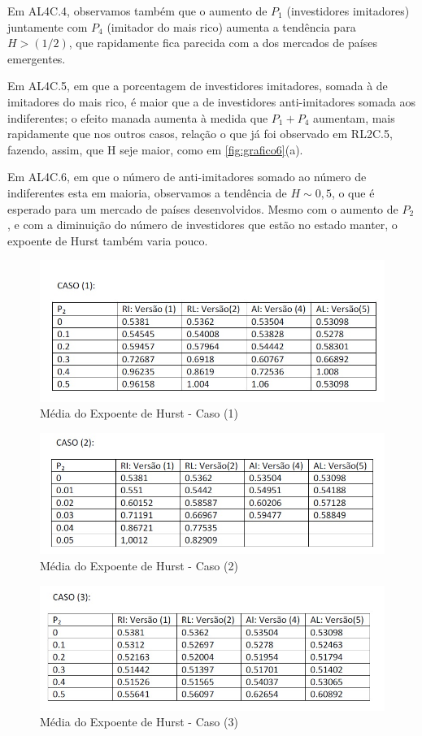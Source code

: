 \documentclass[brazil,ruledheader]{abnt}
\begin{document}
Em AL4C.4, observamos também que o aumento de $P_1$ (investidores imitadores)
juntamente com $P_4$ (imitador do mais rico) aumenta a tendência para $H>(1/2)$,
que rapidamente fica parecida com a dos mercados de países emergentes. 

Em AL4C.5, em que a porcentagem de investidores imitadores, somada à de 
imitadores do mais rico, é maior que a de investidores anti-imitadores somada
aos indiferentes; o efeito manada aumenta à medida que $P_1+P_4$ aumentam, mais
rapidamente que nos outros casos, relação o que já foi observado em RL2C.5,
fazendo, assim, que H seje maior, como em \ref{fig:grafico6}(a).   

Em AL4C.6, em que o número de anti-imitadores somado ao número de indiferentes
esta em maioria, observamos a tendência de $H\sim 0,5$, o que é esperado para um
mercado de países desenvolvidos. Mesmo com o aumento de $P_2$, e com a
diminuição do número de investidores que estão no estado manter, o expoente de
Hurst também varia pouco.

\begin{figure}[!h]
\centering
\includegraphics[width=.7\linewidth]{Figuras/tabela1.jpg}
\caption{Média do Expoente de Hurst - Caso (1)}
\label{fig:tabela1}
\end{figure}

\begin{figure}[!h]
\centering
\includegraphics[width=.7\linewidth]{Figuras/tabela2.jpg}
\caption{Média do Expoente de Hurst - Caso (2)}
\label{fig:tabela2}
\end{figure}

\begin{figure}[!h]
\centering
\includegraphics[width=.7\linewidth]{Figuras/tabela3.jpg}
\caption{Média do Expoente de Hurst - Caso (3)}
\label{fig:tabela3}
\end{figure}
\end{document}
